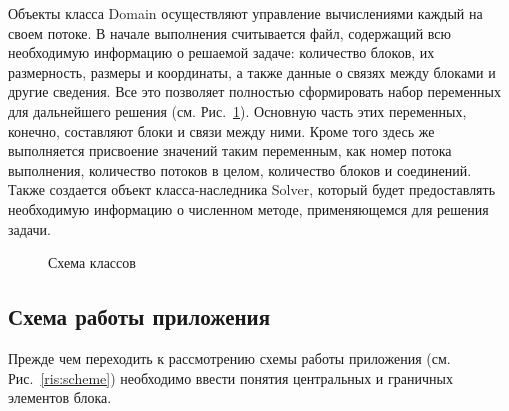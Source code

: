 \documentclass[a4paper, 14pt]{extarticle}
\theoremstyle{definition}
\begin{document}
\par Объекты класса Domain осуществляют управление вычислениями каждый на своем потоке. В начале выполнения считывается файл, содержащий всю необходимую информацию о решаемой задаче: количество блоков, их размерность, размеры и координаты, а также данные о связях между блоками и другие сведения. Все это позволяет полностью сформировать набор переменных для дальнейшего решения (см. Рис.~\ref{ris:all}). Основную часть этих переменных, конечно, составляют блоки и связи между ними. Кроме того здесь же выполняется присвоение значений таким переменным, как номер потока выполнения, количество потоков в целом, количество блоков и соединений. Также создается объект класса-наследника Solver, который будет предоставлять необходимую информацию о численном методе, применяющемся для решения задачи.
\begin{figure}[h]
	\caption{Схема классов}
	\label{ris:all}
\end{figure}



\subsection{Схема работы приложения}

\par Прежде чем переходить к рассмотрению схемы работы приложения (см. Рис.~\ref{ris:scheme}) необходимо ввести понятия центральных и граничных элементов блока.
\end{document}
